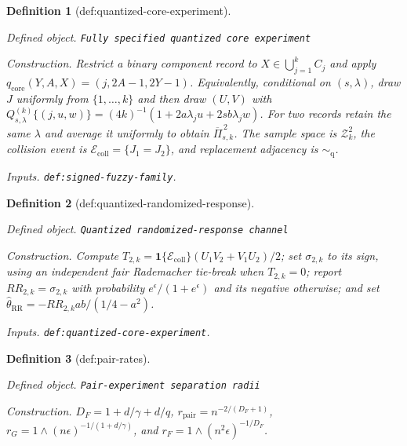 \documentclass{article}
\newtheorem{definition}{Definition}
\begin{document}
\begin{definition}[def:quantized-core-experiment]\label{def:quantized-core-experiment}
\par\smallskip\noindent\emph{Defined object.} \texttt{Fully specified quantized core experiment}
\par\smallskip\noindent\emph{Construction.} Restrict a binary component record to \(X\in\bigcup_{j=1}^kC_j\) and apply \(q_{\mathrm{core}}(Y,A,X)=(j,2A-1,2Y-1)\). Equivalently, conditional on \((s,\lambda)\), draw \(J\) uniformly from \(\{1,\ldots,k\}\) and then draw \((U,V)\) with \(Q_{s,\lambda}^{(k)}\{(j,u,w)\}=(4k)^{-1}(1+2a\lambda_ju+2sb\lambda_jw)\). For two records retain the same \(\lambda\) and average it uniformly to obtain \(\overline\Pi_{s,k}^{\,2}\). The sample space is \(\mathcal Z_k^2\), the collision event is \(\mathcal E_{\mathrm{coll}}=\{J_1=J_2\}\), and replacement adjacency is \(\sim_{\mathrm q}\).
\par\smallskip\noindent\emph{Inputs.} \texttt{def:\allowbreak{}signed-\allowbreak{}fuzzy-\allowbreak{}family}.
\end{definition}

\begin{definition}[def:quantized-randomized-response]\label{def:quantized-randomized-response}
\par\smallskip\noindent\emph{Defined object.} \texttt{Quantized randomized-\allowbreak{}response channel}
\par\smallskip\noindent\emph{Construction.} Compute \(T_{2,k}=\mathbf 1\{\mathcal E_{\mathrm{coll}}\}(U_1V_2+V_1U_2)/2\); set \(\sigma_{2,k}\) to its sign, using an independent fair Rademacher tie-break when \(T_{2,k}=0\); report \(RR_{2,k}=\sigma_{2,k}\) with probability \(e^\epsilon/(1+e^\epsilon)\) and its negative otherwise; and set \(\widehat\theta_{\mathrm{RR}}=-RR_{2,k}ab/(1/4-a^2)\).
\par\smallskip\noindent\emph{Inputs.} \texttt{def:\allowbreak{}quantized-\allowbreak{}core-\allowbreak{}experiment}.
\end{definition}

\begin{definition}[def:pair-rates]\label{def:pair-rates}
\par\smallskip\noindent\emph{Defined object.} \texttt{Pair-\allowbreak{}experiment separation radii}
\par\smallskip\noindent\emph{Construction.} \(D_F=1+d/\gamma+d/q\), \(r_{\mathrm{pair}}=n^{-2/(D_F+1)}\), \(r_G=1\wedge(n\epsilon)^{-1/(1+d/\gamma)}\), and \(r_F=1\wedge(n^2\epsilon)^{-1/D_F}\).
\end{definition}
\end{document}
